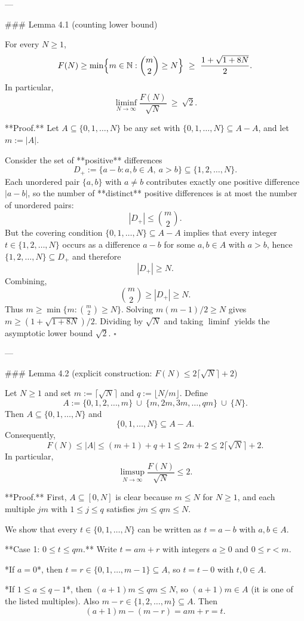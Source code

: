 ---

### Lemma 4.1 (counting lower bound)

For every $N\ge 1$,
\[
F(N)\ge \min\Bigl\{m\in\mathbb N: \binom{m}{2}\ge N\Bigr\}
\ \ge\ \frac{1+\sqrt{1+8N}}{2}.
\]
In particular,
\[
\liminf_{N\to\infty} \frac{F(N)}{\sqrt N}\ \ge\ \sqrt2.
\]

**Proof.**
Let $A\subseteq\{0,1,\dots,N\}$ be any set with $\{0,1,\dots,N\}\subseteq A-A$, and let $m:=|A|$.

Consider the set of **positive** differences
\[
D_+:=\{a-b: a,b\in A,\ a>b\}\subseteq \{1,2,\dots,N\}.
\]
Each unordered pair $\{a,b\}$ with $a\ne b$ contributes exactly one positive difference $|a-b|$, so the number of **distinct** positive differences is at most the number of unordered pairs:
\[
|D_+|\le \binom{m}{2}.
\]
But the covering condition $\{0,1,\dots,N\}\subseteq A-A$ implies that every integer $t\in\{1,2,\dots,N\}$ occurs as a difference $a-b$ for some $a,b\in A$ with $a>b$, hence $\{1,2,\dots,N\}\subseteq D_+$ and therefore
\[
|D_+|\ge N.
\]
Combining,
\[
\binom{m}{2}\ge |D_+|\ge N.
\]
Thus $m\ge \min\{m: \binom{m}{2}\ge N\}$. Solving $m(m-1)/2\ge N$ gives $m\ge (1+\sqrt{1+8N})/2$.
Dividing by $\sqrt N$ and taking $\liminf$ yields the asymptotic lower bound $\sqrt2$.
$\square$

---

### Lemma 4.2 (explicit construction: $F(N)\le 2\lceil\sqrt N\rceil+2$)

Let $N\ge 1$ and set $m:=\lceil\sqrt N\rceil$ and $q:=\lfloor N/m\rfloor$.
Define
\[
A:=\{0,1,2,\dots,m\}\ \cup\ \{m,2m,3m,\dots,qm\}\ \cup\ \{N\}.
\]
Then $A\subseteq\{0,1,\dots,N\}$ and
\[
\{0,1,\dots,N\}\subseteq A-A.
\]
Consequently,
\[
F(N)\le |A|\le (m+1)+q+1 \le 2m+2 \le 2\lceil\sqrt N\rceil+2.
\]
In particular,
\[
\limsup_{N\to\infty} \frac{F(N)}{\sqrt N}\le 2.
\]

**Proof.**
First, $A\subseteq[0,N]$ is clear because $m\le N$ for $N\ge 1$, and each multiple $jm$ with $1\le j\le q$ satisfies $jm\le qm\le N$.

We show that every $t\in\{0,1,\dots,N\}$ can be written as $t=a-b$ with $a,b\in A$.

**Case 1: $0\le t\le qm$.**
Write $t=am+r$ with integers $a\ge 0$ and $0\le r<m$.

*If $a=0$*, then $t=r\in\{0,1,\dots,m-1\}\subseteq A$, so $t=t-0$ with $t,0\in A$.

*If $1\le a\le q-1$*, then $(a+1)m\le qm\le N$, so $(a+1)m\in A$ (it is one of the listed multiples). Also $m-r\in\{1,2,\dots,m\}\subseteq A$.
Then
\[
(a+1)m-(m-r)=am+r=t.
\]

